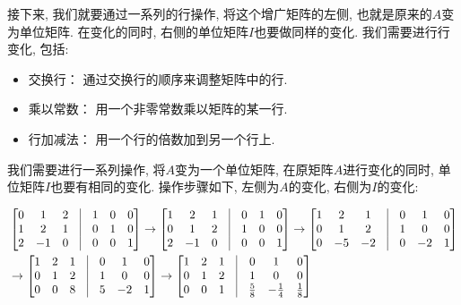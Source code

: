 接下来, 我们就要通过一系列的行操作, 将这个增广矩阵的左侧, 也就是原来的$A$变为单位矩阵. 在变化的同时, 右侧的单位矩阵$I$也要做同样的变化. 我们需要进行行变化, 包括:

\begin{itemize}
  \item 交换行： 通过交换行的顺序来调整矩阵中的行. 
  \item 乘以常数： 用一个非零常数乘以矩阵的某一行. 
  \item 行加减法： 用一个行的倍数加到另一个行上. 
\end{itemize}

我们需要进行一系列操作, 将$A$变为一个单位矩阵, 在原矩阵$A$进行变化的同时, 单位矩阵$I$也要有相同的变化. 操作步骤如下, 左侧为$A$的变化, 右侧为$I$的变化:

\begin{align*}
& \begin{bmatrix}
    0 & 1 & 2 & \vline & 1 & 0 & 0 \\
    1 & 2 & 1 & \vline & 0 & 1 & 0 \\
    2 & -1 & 0 & \vline & 0 & 0 & 1 \\
  \end{bmatrix} 
  \rightarrow
  \begin{bmatrix}
    1 & 2 & 1 & \vline & 0 & 1 & 0 \\
    0 & 1 & 2 & \vline & 1 & 0 & 0 \\
    2 & -1 & 0 & \vline & 0 & 0 & 1 \\
  \end{bmatrix}
  \rightarrow
  \begin{bmatrix}
    1 & 2 & 1 & \vline & 0 & 1 & 0 \\
    0 & 1 & 2 & \vline & 1 & 0 & 0 \\
    0 & -5 & -2 & \vline & 0 & -2 & 1 \\
  \end{bmatrix}  \\
& \rightarrow
  \begin{bmatrix}
    1 & 2 & 1 & \vline & 0 & 1 & 0 \\
    0 & 1 & 2 & \vline & 1 & 0 & 0 \\
    0 & 0 & 8 & \vline & 5 & -2 & 1 \\
  \end{bmatrix} 
  \rightarrow
  \begin{bmatrix}
    1 & 2 & 1 & \vline & 0 & 1 & 0 \\
    0 & 1 & 2 & \vline & 1 & 0 & 0 \\
    0 & 0 & 1 & \vline & \frac{5}{8} & -\frac{1}{4} & \frac{1}{8} \\

\end{bmatrix}
\end{align*}
